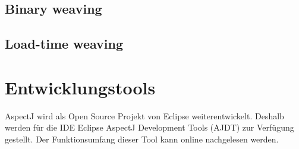 \subsection{Binary weaving}

\subsection{Load-time weaving}

\section{Entwicklungstools}
AspectJ wird als Open Source Projekt von Eclipse weiterentwickelt. Deshalb werden für die IDE Eclipse AspectJ Development Tools (AJDT) zur Verfügung gestellt. Der Funktionsumfang dieser Tool kann online nachgelesen werden. \cite{eclipse:ajdt}